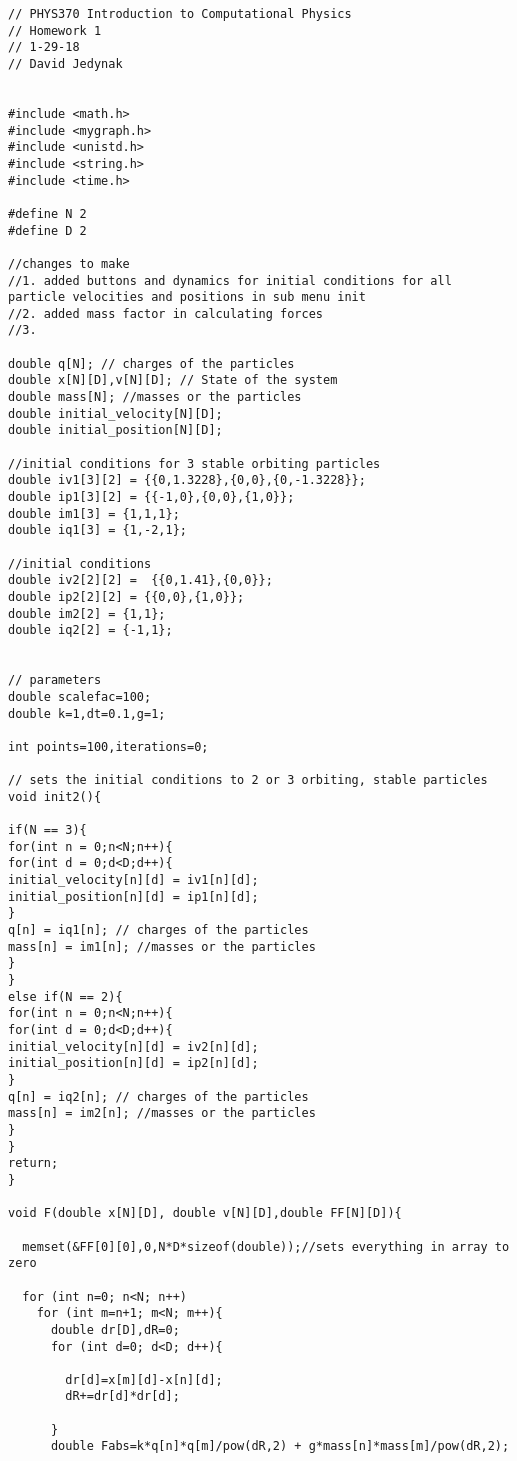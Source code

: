 \documentclass[a4paper]{article}
\begin{document}
\begin{verbatim}
// PHYS370 Introduction to Computational Physics
// Homework 1
// 1-29-18
// David Jedynak
 

#include <math.h>
#include <mygraph.h>
#include <unistd.h>
#include <string.h>
#include <time.h>

#define N 2
#define D 2

//changes to make
//1. added buttons and dynamics for initial conditions for all particle velocities and positions in sub menu init
//2. added mass factor in calculating forces
//3. 

double q[N]; // charges of the particles
double x[N][D],v[N][D]; // State of the system
double mass[N]; //masses or the particles
double initial_velocity[N][D];
double initial_position[N][D];

//initial conditions for 3 stable orbiting particles
double iv1[3][2] = {{0,1.3228},{0,0},{0,-1.3228}};
double ip1[3][2] = {{-1,0},{0,0},{1,0}};
double im1[3] = {1,1,1};
double iq1[3] = {1,-2,1};

//initial conditions 
double iv2[2][2] =  {{0,1.41},{0,0}};
double ip2[2][2] = {{0,0},{1,0}};
double im2[2] = {1,1};
double iq2[2] = {-1,1};


// parameters
double scalefac=100;
double k=1,dt=0.1,g=1;

int points=100,iterations=0;

// sets the initial conditions to 2 or 3 orbiting, stable particles 
void init2(){

if(N == 3){
for(int n = 0;n<N;n++){
for(int d = 0;d<D;d++){
initial_velocity[n][d] = iv1[n][d];
initial_position[n][d] = ip1[n][d];
}
q[n] = iq1[n]; // charges of the particles
mass[n] = im1[n]; //masses or the particles
}
}
else if(N == 2){
for(int n = 0;n<N;n++){
for(int d = 0;d<D;d++){
initial_velocity[n][d] = iv2[n][d];
initial_position[n][d] = ip2[n][d];
}
q[n] = iq2[n]; // charges of the particles
mass[n] = im2[n]; //masses or the particles
}
}
return;
}

void F(double x[N][D], double v[N][D],double FF[N][D]){

  memset(&FF[0][0],0,N*D*sizeof(double));//sets everything in array to zero

  for (int n=0; n<N; n++)
    for (int m=n+1; m<N; m++){
      double dr[D],dR=0;
      for (int d=0; d<D; d++){

        dr[d]=x[m][d]-x[n][d];
        dR+=dr[d]*dr[d];

      }
      double Fabs=k*q[n]*q[m]/pow(dR,2) + g*mass[n]*mass[m]/pow(dR,2);
       


\end{verbatim}
\end{document}
